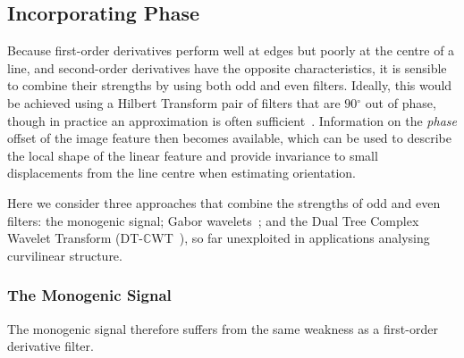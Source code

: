 \documentclass{IEEEtran}
\def\dtcwt{DT-$\mathbb{C}$WT}
\def\deg{\ensuremath{^\circ}}
\newcommand{\comment}[1]{}
\begin{document}
\comment{Haar-like approximations are not as new as I first hoped - they are the basis of the SURF feature descriptor, and Peter Kovesi also wrote a paper explaining why even this is not the most efficient thing to do. I've removed it until we can justify having it in.}

\subsection{Incorporating Phase}
Because first-order derivatives perform well at edges but poorly at the centre of a line, and second-order derivatives have the opposite characteristics, it is sensible to combine their strengths by using both odd and even filters. Ideally, this would be achieved using a Hilbert Transform pair of filters that are $90\deg$ out of phase, though in practice an approximation is often sufficient~\cite{Freeman_Adelson_TPAMI91}. Information on the \emph{phase} offset of the image feature then becomes available, which can be used to describe the local shape of the linear feature and provide invariance to small displacements from the line centre when estimating orientation.



Here we consider three approaches that combine the strengths of odd and even filters: the monogenic signal; Gabor wavelets~\cite{Daugman_TASSP88}; and the Dual Tree Complex Wavelet Transform (\dtcwt{}~\cite{Kingsbury_PTRSLA99}), so far unexploited in applications analysing curvilinear structure.

\subsubsection{The Monogenic Signal}
%
The monogenic signal therefore suffers from the same weakness as a first-order derivative filter.
\end{document}
